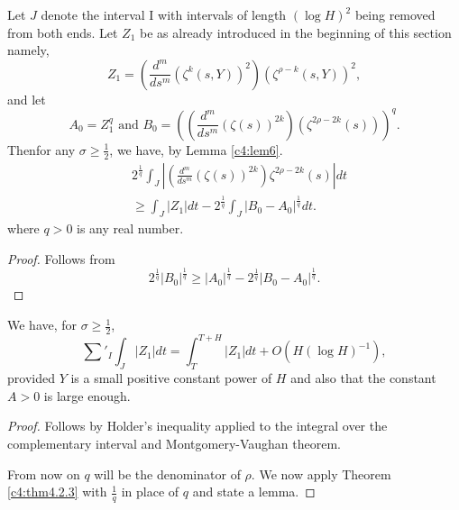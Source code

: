 \begin{lem}\label{c4:lem7}
Let $J$ denote the interval I with intervals of length $(\log H)^2$ being removed from both ends. Let $Z_1$ be as already introduced in the beginning of this section namely,
\begin{equation*}
Z_1 = \left(\frac{d^m}{ds^m} (\zeta^k (s,Y))^2\right) (\zeta^{\rho -k} (s,Y))^2, \tag{4.2.7}\label{c4:eq4.2.7}
\end{equation*}
and let 
\begin{equation*}
A_0 = Z^q_1 \text{ and } B_0 = \left(\left(\frac{d^m}{ds^m} (\zeta(s))^{2k}\right) (\zeta^{2\rho - 2k} (s))\right)^q. \tag{4.2.8}\label{c4:eq4.2.8}
\end{equation*}
Then\pageoriginale for any $\sigma \geq \frac{1}{2}$, we have, by Lemma \ref{c4:lem6}.
\begin{align*}
& 2^{\frac{1}{q}} \int_J |\left(\frac{d^m}{ds^m} (\zeta(s))^{2k}\right) \zeta^{2\rho - 2k} (s)| dt \\
& \geq \int_J |Z_1| dt - 2^{\frac{1}{q}} \int_J |B_0 -A_0|^{\frac{1}{q}} dt. \tag{4.2.9} \label{c4:eq4.2.9}
\end{align*}
where $q > 0$ is any real number.
\end{lem}

\begin{proof}
Follows from
$$
2^{\frac{1}{q}} |B_0|^{\frac{1}{q}} \geq |A_0|^{\frac{1}{q}} - 2^{\frac{1}{q}} |B_0 - A_0|^{\frac{1}{q}}.
$$
\end{proof}

\begin{lem}\label{c4:lem8}
We have, for $\sigma \geq \frac{1}{2}$,
\begin{equation*}
\sum'_I \int_J |Z_1| dt = \int^{T+H}_T |Z_1| dt + O(H(\log H)^{-1}) ,  \tag{4.2.10}\label{c4:eq4.2.10}
\end{equation*}
provided $Y$ is a small positive constant power of $H$ and also that the constant $A>0$ is large enough.
\end{lem}

\begin{proof}
Follows by Holder's inequality applied to the integral over the complementary interval and Montgomery-Vaughan theorem.

From now on $q$ will be the denominator of $\rho$. We now apply Theorem \ref{c4:thm4.2.3} with $\frac{1}{q}$ in place of $q$ and state a lemma.
\end{proof}


